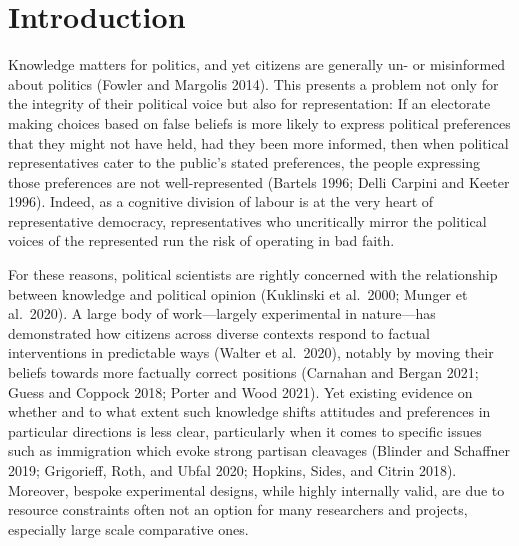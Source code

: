 \documentclass[12pt,halfline,a4paper,]{ouparticle}
\begin{document}
\date{\today}


\maketitle



\hypertarget{introduction}{%
\section{Introduction}\label{introduction}}

Knowledge matters for politics, and yet citizens are generally un- or
misinformed about politics (Fowler and Margolis 2014). This presents a
problem not only for the integrity of their political voice but also for
representation: If an electorate making choices based on false beliefs
is more likely to express political preferences that they might not have
held, had they been more informed, then when political representatives
cater to the public's stated preferences, the people expressing those
preferences are not well-represented (Bartels 1996; Delli Carpini and
Keeter 1996). Indeed, as a cognitive division of labour is at the very
heart of representative democracy, representatives who uncritically
mirror the political voices of the represented run the risk of operating
in bad faith.

For these reasons, political scientists are rightly concerned with the
relationship between knowledge and political opinion (Kuklinski et
al.~2000; Munger et al.~2020). A large body of work---largely
experimental in nature---has demonstrated how citizens across diverse
contexts respond to factual interventions in predictable ways (Walter et
al.~2020), notably by moving their beliefs towards more factually
correct positions (Carnahan and Bergan 2021; Guess and Coppock 2018;
Porter and Wood 2021). Yet existing evidence on whether and to what
extent such knowledge shifts attitudes and preferences in particular
directions is less clear, particularly when it comes to specific issues
such as immigration which evoke strong partisan cleavages (Blinder and
Schaffner 2019; Grigorieff, Roth, and Ubfal 2020; Hopkins, Sides, and
Citrin 2018). Moreover, bespoke experimental designs, while highly
internally valid, are due to resource constraints often not an option
for many researchers and projects, especially large scale comparative
ones.
\end{document}
